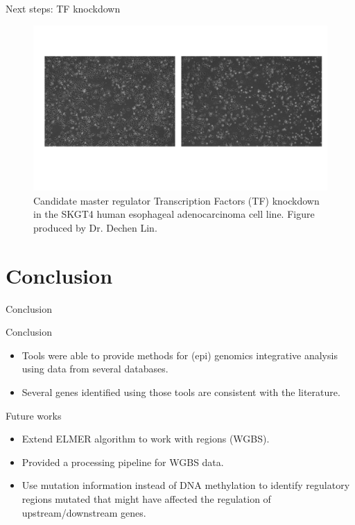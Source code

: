 \documentclass[slidestop,compress,11pt,xcolor=dvipsnames]{beamer}
\begin{document}
\begin{frame}{Next steps: TF knockdown}
 \begin{figure}[ht!]
  \centering
  \includegraphics[width=1.0\textwidth]{glioma/knockdown_TF_ESCA.pdf}
  \caption{Candidate master regulator Transcription Factors (TF) knockdown in the SKGT4 human esophageal adenocarcinoma cell line. Figure produced by Dr. Dechen Lin.}
 \end{figure}
\end{frame}

\section{Conclusion}
\begin{frame}{Conclusion}
\begin{block}{Conclusion}
  \begin{itemize}
    \item  Tools were able to provide methods for (epi) genomics integrative analysis
    using data from several databases.
    \item  Several genes identified using those tools are consistent with the literature.
  \end{itemize}
\end{block}
\begin{block}{Future works}
  \begin{itemize}
    \item Extend ELMER algorithm to work with regions (WGBS).
    \item Provided a processing pipeline for WGBS data.
    \item Use mutation information instead of DNA methylation
to identify regulatory regions mutated that might have affected the
regulation of upstream/downstream genes.
  \end{itemize}
\end{block}
\end{frame}
\end{document}
